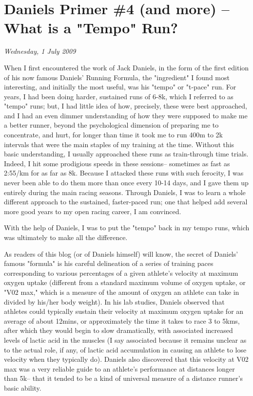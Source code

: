 \chapter{Daniels Primer \#4 (and more) -- What is a "Tempo" Run?}
\textit{Wednesday, 1 July 2009}
\bigskip

When I first encountered the work of Jack Daniels, in the form of the first edition of his now famous Daniels' Running Formula, the "ingredient" I found most interesting, and initially the most useful, was his "tempo" or "t-pace" run. For years, I had been doing harder, sustained runs of 6-8k, which I referred to as "tempo" runs; but, I had little idea of how, precisely, these were best approached, and I had an even dimmer understanding of how they were supposed to make me a better runner, beyond the psychological dimension of preparing me to concentrate, and hurt, for longer than time it took me to run 400m to 2k intervals that were the main staples of my training at the time. Without this basic understanding, I usually approached these runs as train-through time trials. Indeed, I hit some prodigious speeds in these sessions-- sometimes as fast as 2:55/km for as far as 8k. Because I attacked these runs with such ferocity, I was never been able to do them more than once every 10-14 days, and I gave them up entirely during the main racing seasons. Through Daniels, I was to learn a whole different approach to the sustained, faster-paced run; one that helped add several more good years to my open racing career, I am convinced.

With the help of Daniels, I was to put the "tempo" back in my tempo runs, which was ultimately to make all the difference.

As readers of this blog (or of Daniels himself) will know, the secret of Daniels' famous "formula" is his careful delineation of a series of training paces corresponding to various percentages of a given athlete's velocity at maximum oxygen uptake (different from a standard maximum volume of oxygen uptake, or "V02 max," which is a measure of the amount of oxygen an athlete can take in divided by his/her body weight). In his lab studies, Daniels observed that athletes could typically sustain their velocity at maximum oxygen uptake for an average of about 12mins, or approximately the time it takes to race 3 to 5kms, after which they would begin to slow dramatically, with associated increased levels of lactic acid in the muscles (I say associated because it remains unclear as to the actual role, if any, of lactic acid accumulation in causing an athlete to lose velocity when they typically do). Daniels also discovered that this velocity at V02 max was a very reliable guide to an athlete's performance at distances longer than 5k-- that it tended to be a kind of universal measure of a distance runner's basic ability.

